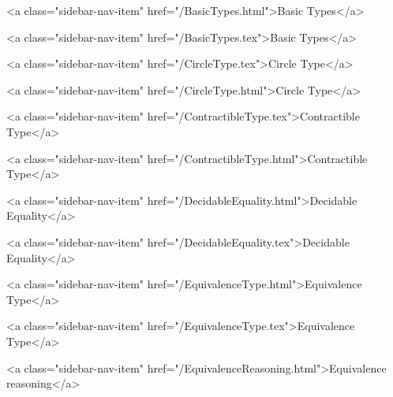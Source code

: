       
    
      
        
          <a class="sidebar-nav-item" href="/BasicTypes.html">Basic Types</a>
        
      
    
      
        
          <a class="sidebar-nav-item" href="/BasicTypes.tex">Basic Types</a>
        
      
    
      
        
          <a class="sidebar-nav-item" href="/CircleType.tex">Circle Type</a>
        
      
    
      
        
          <a class="sidebar-nav-item" href="/CircleType.html">Circle Type</a>
        
      
    
      
        
          <a class="sidebar-nav-item" href="/ContractibleType.tex">Contractible Type</a>
        
      
    
      
        
          <a class="sidebar-nav-item" href="/ContractibleType.html">Contractible Type</a>
        
      
    
      
        
          <a class="sidebar-nav-item" href="/DecidableEquality.html">Decidable Equality</a>
        
      
    
      
        
          <a class="sidebar-nav-item" href="/DecidableEquality.tex">Decidable Equality</a>
        
      
    
      
        
          <a class="sidebar-nav-item" href="/EquivalenceType.html">Equivalence Type</a>
        
      
    
      
        
          <a class="sidebar-nav-item" href="/EquivalenceType.tex">Equivalence Type</a>
        
      
    
      
        
          <a class="sidebar-nav-item" href="/EquivalenceReasoning.html">Equivalence reasoning</a>
        
